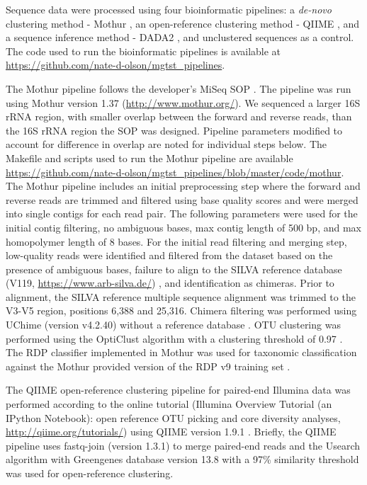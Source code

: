 \documentclass{bmcart}
\begin{document}
Sequence data were processed using four bioinformatic pipelines: a
\emph{de-novo} clustering method - Mothur
\cite{schloss2009introducing}, an open-reference clustering method -
QIIME \cite{Caporaso2010}, and a sequence inference method - DADA2
\cite{callahan2016dada2}, and unclustered sequences as a control. The
code used to run the bioinformatic pipelines is available at
\url{https://github.com/nate-d-olson/mgtst_pipelines}.

The Mothur pipeline follows the developer's MiSeq SOP
\cite{schloss2009introducing, kozich2013development}. The pipeline was
run using Mothur version 1.37 (\url{http://www.mothur.org/}). We
sequenced a larger 16S rRNA region, with smaller overlap between the
forward and reverse reads, than the 16S rRNA region the SOP was
designed. Pipeline parameters modified to account for difference in
overlap are noted for individual steps below. The Makefile and scripts
used to run the Mothur pipeline are available
\url{https://github.com/nate-d-olson/mgtst_pipelines/blob/master/code/mothur}.
The Mothur pipeline includes an initial preprocessing step where the
forward and reverse reads are trimmed and filtered using base quality
scores and were merged into single contigs for each read pair. The
following parameters were used for the initial contig filtering, no
ambiguous bases, max contig length of 500 bp, and max homopolymer length
of 8 bases. For the initial read filtering and merging step, low-quality
reads were identified and filtered from the dataset based on the
presence of ambiguous bases, failure to align to the SILVA reference
database (V119, \url{https://www.arb-silva.de/}) \cite{quast2012silva},
and identification as chimeras. Prior to alignment, the SILVA reference
multiple sequence alignment was trimmed to the V3-V5 region, positions
6,388 and 25,316. Chimera filtering was performed using UChime (version
v4.2.40) without a reference database \cite{edgar2011uchime}. OTU
clustering was performed using the OptiClust algorithm with a clustering
threshold of 0.97 \cite{westcott2017opticlust}. The RDP classifier
implemented in Mothur was used for taxonomic classification against the
Mothur provided version of the RDP v9 training set
\cite{wang2007naive}.

The QIIME open-reference clustering pipeline for paired-end Illumina
data was performed according to the online tutorial (Illumina Overview
Tutorial (an IPython Notebook): open reference OTU picking and core
diversity analyses, \url{http://qiime.org/tutorials/}) using QIIME
version 1.9.1 \cite{Caporaso2010}. Briefly, the QIIME pipeline uses
fastq-join (version 1.3.1) to merge paired-end reads
\cite{aronesty2011ea} and the Usearch algorithm \cite{edgar2010search}
with Greengenes database version 13.8 with a 97\% similarity threshold
\cite{desantis2006greengenes} was used for open-reference clustering.
\end{document}
